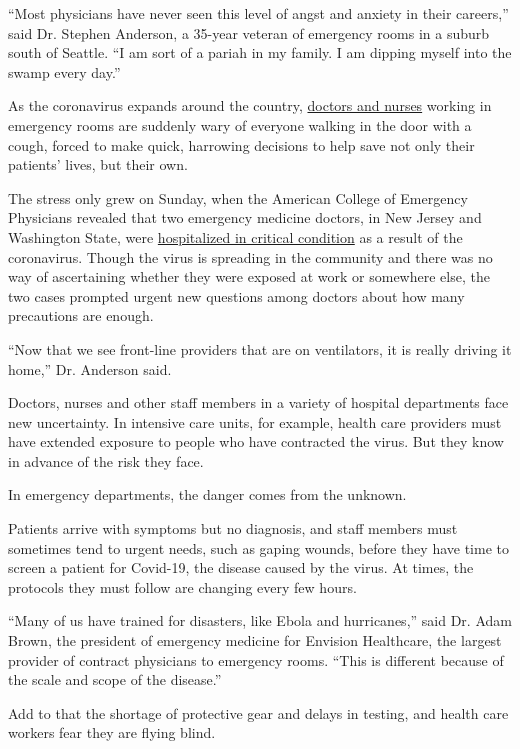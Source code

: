 ``Most physicians have never seen this level of angst and anxiety in
their careers,'' said Dr. Stephen Anderson, a 35-year veteran of
emergency rooms in a suburb south of Seattle. ``I am sort of a pariah in
my family. I am dipping myself into the swamp every day.''

As the coronavirus expands around the country,
\href{https://www.nytimes3xbfgragh.onion/2020/04/13/nyregion/coronavirus-nyc-doctors.html}{doctors
and nurses} working in emergency rooms are suddenly wary of everyone
walking in the door with a cough, forced to make quick, harrowing
decisions to help save not only their patients' lives, but their own.

The stress only grew on Sunday, when the American College of Emergency
Physicians revealed that two emergency medicine doctors, in New Jersey
and Washington State, were
\href{https://www.nytimes3xbfgragh.onion/2020/03/15/us/coronavirus-physicians-emergency-rooms.html}{hospitalized
in critical condition} as a result of the coronavirus. Though the virus
is spreading in the community and there was no way of ascertaining
whether they were exposed at work or somewhere else, the two cases
prompted urgent new questions among doctors about how many precautions
are enough.

``Now that we see front-line providers that are on ventilators, it is
really driving it home,'' Dr. Anderson said.

Doctors, nurses and other staff members in a variety of hospital
departments face new uncertainty. In intensive care units, for example,
health care providers must have extended exposure to people who have
contracted the virus. But they know in advance of the risk they face.

In emergency departments, the danger comes from the unknown.

Patients arrive with symptoms but no diagnosis, and staff members must
sometimes tend to urgent needs, such as gaping wounds, before they have
time to screen a patient for Covid-19, the disease caused by the virus.
At times, the protocols they must follow are changing every few hours.

``Many of us have trained for disasters, like Ebola and hurricanes,''
said Dr. Adam Brown, the president of emergency medicine for Envision
Healthcare, the largest provider of contract physicians to emergency
rooms. ``This is different because of the scale and scope of the
disease.''

Add to that the shortage of protective gear and delays in testing, and
health care workers fear they are flying blind.

